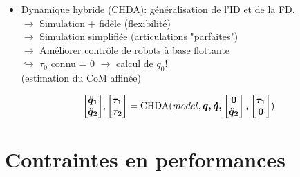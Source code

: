 \documentclass[10pt]{beamer}
\begin{document}
\begin{frame}[allowframebreaks]
	\begin{block}{}
	\begin{spacing}{1.2}
	\begin{itemize}
	\item Dynamique hybride (CHDA): généralisation de l'ID et de la FD.\\
	      $\rightarrow$ Simulation + fidèle (flexibilité) \\
        $\rightarrow$ Simulation simplifiée (articulations "parfaites") \\
        $\rightarrow$ Améliorer contrôle de robots à base flottante \\
                      $\hookrightarrow$ $\tau_0$ connu = 0 $\rightarrow$ calcul de $\ddot{q}_0$! \\
                                        (estimation du CoM affinée)
  \end{itemize}
  \end{spacing}
  \end{block}
	
	\begin{equation}
	\boldsymbol{\begin{bmatrix} \ddot{q}_1 \\ \ddot{q}_2	\end{bmatrix}}, \boldsymbol{\begin{bmatrix} \tau_1 \\ \tau_2	\end{bmatrix}} = \mathrm{CHDA}(model,\boldsymbol{q,\dot{q},\begin{bmatrix} 0 \\ \ddot{q}_2	\end{bmatrix},\begin{bmatrix} \tau_1 \\ 0	\end{bmatrix}})
	\end{equation}
	
\end{frame}


\section{Contraintes en performances}
\end{document}
